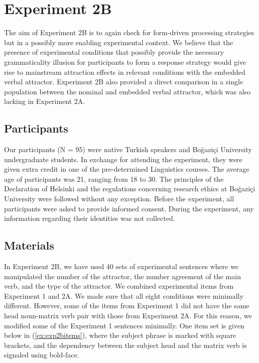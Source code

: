 \section{Experiment 2B}

The aim of Experiment 2B is to again check for form-driven processing strategies but in a possibly more enabling experimental context. We believe that the presence of experimental conditions that possibly provide the necessary grammaticality illusion for participants to form a response strategy would give rise to mainstream attraction effects in relevant conditions with the embedded verbal attractor. Experiment 2B also provided a direct comparison in a single population between the nominal and embedded verbal attractor, which was also lacking in Experiment 2A.

\subsection{Participants}

Our participants (N = 95) were native Turkish speakers and Bo\u{g}azi\c{c}i University undergraduate students. In exchange for attending the experiment, they were given extra credit in one of the pre-determined Linguistics courses. The average age of participants was 21, ranging from 18 to 30. The principles of the Declaration of Helsinki and the regulations concerning research ethics at Bo\u{g}azi\c{c}i University were followed without any exception. Before the experiment, all participants were asked to provide informed consent. During the experiment, any information regarding their identities was not collected. 

\subsection{Materials}

In Experiment 2B, we have used 40 sets of experimental sentences where we manipulated the number of the attractor, the number agreement of the main verb, and the type of the attractor. We combined experimental items from Experiment 1 and 2A. We made sure that all eight conditions were minimally different. However, some of the items from Experiment 1 did not have the same head noun-matrix verb pair with those from Experiment 2A. For this reason, we modified some of the Experiment 1 sentences minimally. One item set is given below in (\ref{ex:exp2bitems}), where the subject phrase is marked with square brackets, and the dependency between the subject head and the matrix verb is signaled using bold-face.


